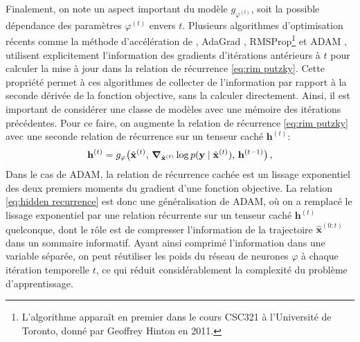 Finalement, on note un aspect important du modèle $g_{\varphi^{(t)}}$, soit la possible dépendance des paramètres $\varphi^{(t)}$ envers $t$. Plusieurs 
algorithmes d'optimisation récents comme la méthode d'accélération de \citet{Nesterov1983}, 
AdaGrad \citep{Duchi2011}, RMSProp\footnote{L'algorithme apparaît en premier dans le cours CSC321 à l'Université de Toronto, donné par Geoffrey Hinton en 2011.} \citep{Hinton2012} 
et ADAM \citep{Kingma2014},
utilisent explicitement l'information 
des gradients d'itérations antérieurs à $t$ pour calculer la mise à jour dans la relation de récurrence \eqref{eq:rim putzky}.
Cette propriété permet à ces algorithmes de collecter de l'information par rapport à la seconde dérivée de la fonction 
objective, sans la calculer directement.
Ainsi, il est important de considérer une classe de modèles avec une mémoire des itérations précédentes. 
Pour ce faire, on augmente la relation de récurrence \eqref{eq:rim putzky} avec une seconde relation de 
récurrence sur un tenseur caché $\mathbf{h}^{(t)}$:
\begin{equation}\label{eq:hidden recurrence}
        \mathbf{h}^{(t)} = g_{\varphi}\big(\hat{\mathbf{x}}^{(t)},\, \grad_{\hat{\mathbf{x}}^{(t)}} \log p(\mathbf{y} \mid \hat{\mathbf{x}}^{(t)}),\,  \mathbf{h}^{(t-1)}\big)\, ,
\end{equation} 
Dans le cas de ADAM, la relation de récurrence cachée est un lissage exponentiel des deux premiers 
moments du gradient d'une fonction objective.
La relation \eqref{eq:hidden recurrence} est donc une généralisation de ADAM, 
où on a remplacé le lissage exponentiel par une relation récurrente sur un tenseur caché $\mathbf{h}^{(t)}$ quelconque, 
dont le rôle est de compresser l'information de 
la trajectoire $\hat{\mathbf{x}}^{(0:t)}$ dans un sommaire informatif. Ayant ainsi comprimé l'information dans une variable 
séparée, on peut réutiliser les poids du réseau de neurones $\varphi$ à chaque itération temporelle $t$, ce 
qui réduit considérablement la complexité du problème d'apprentissage.



